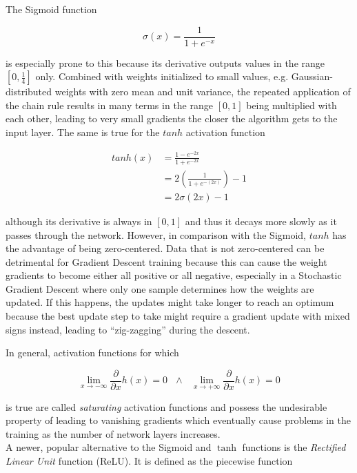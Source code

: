 The Sigmoid function

\[ \sigma(x) = \frac{1}{1 + e^{-x}} \]

\noindent is especially prone to this because its derivative outputs values in the range $\left [0, \frac{1}{4} \right ]$ only. Combined with weights initialized to small values, e.g. Gaussian-distributed weights with zero mean and unit variance, the repeated application of the chain rule results in many terms in the range $\left [0, 1\right ]$ being multiplied with each other, leading to very small gradients the closer the algorithm gets to the input layer. The same is true for the $tanh$ activation function

\begin {align}
	tanh(x) &= \frac{1 - e^{-2x}}{1 + e^{-2x}}\\
		  &= 2 \left ( \frac{1}{1 + e^{-(2x)}} \right ) - 1\\
		  &= 2 \sigma(2x) - 1
\end {align}

\noindent although its derivative is always in $[0, 1]$ and thus it decays more slowly as it passes through the network. However, in comparison with the Sigmoid, $tanh$ has the advantage of being zero-centered. Data that is not zero-centered can be detrimental for Gradient Descent training because this can cause the weight gradients to become either all positive or all negative, especially in a Stochastic Gradient Descent where only one sample determines how the weights are updated. If this happens, the updates might take longer to reach an optimum because the best update step to take might require a gradient update with mixed signs instead, leading to ``zig-zagging'' during the descent.

In general, activation functions for which

\[ \lim \limits_{x \rightarrow -\infty} \frac{\partial}{\partial x} h(x) = 0 \,\,\,\, \land \,\,\,\,  \lim \limits_{x \rightarrow +\infty} \frac{\partial}{\partial x} h(x) = 0 \label{eq:saturation} \]

\noindent is true are called \textit{saturating} activation functions and possess the undesirable property of leading to vanishing gradients which eventually cause problems in the training as the number of network layers increases.\\ 

\noindent A newer, popular alternative to the Sigmoid and $\tanh$ functions is the \textit{Rectified Linear Unit} function (ReLU). It is defined as the piecewise function

